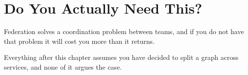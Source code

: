 \chapter{Do You Actually Need This?}
\label{ch:do-you-need-this}

Federation solves a coordination problem between teams, and if you do not have
that problem it will cost you more than it returns.

Everything after this chapter assumes you have decided to split a graph across
services, and none of it argues the case.







